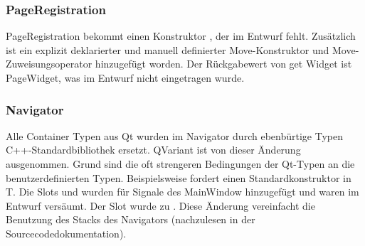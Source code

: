 \subsubsection{PageRegistration}
PageRegistration bekommt einen Konstruktor , der im Entwurf fehlt. Zusätzlich ist ein explizit deklarierter und manuell definierter Move-Konstruktor und Move-Zuweisungsoperator hinzugefügt worden. Der Rückgabewert von get Widget ist PageWidget, was im Entwurf nicht eingetragen wurde.

\subsubsection{Navigator}
Alle Container Typen aus Qt wurden im Navigator durch ebenbürtige Typen C++-Standardbibliothek ersetzt. QVariant ist von dieser Änderung ausgenommen. Grund sind die oft strengeren Bedingungen der Qt-Typen an die benutzerdefinierten Typen. Beispielsweise fordert  einen Standardkonstruktor in T.
Die Slots  und  wurden für Signale des MainWindow hinzugefügt und waren im Entwurf versäumt.
Der Slot  wurde zu . Diese Änderung vereinfacht die Benutzung des Stacks des Navigators (nachzulesen in der Sourcecodedokumentation).
